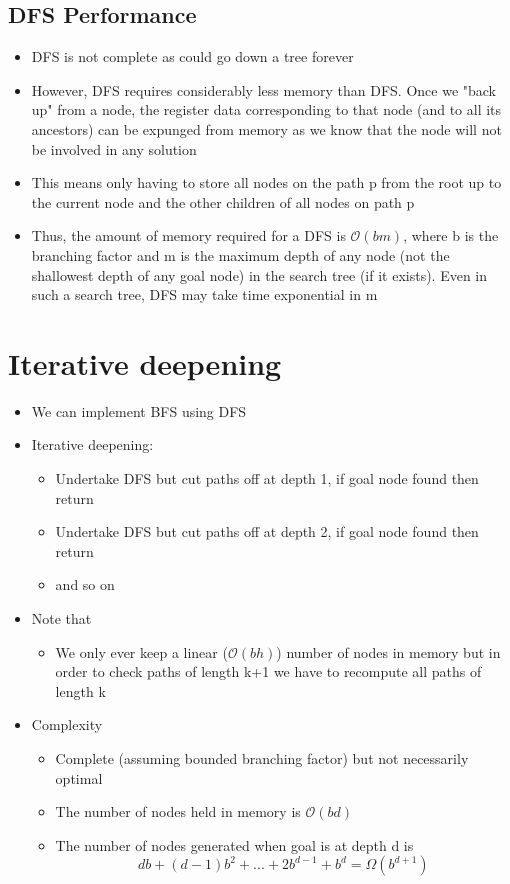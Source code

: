 \documentclass{article}[18pt]
\begin{document}
\subsection{DFS Performance}
\begin{itemize}
	\item DFS is not complete as could go down a tree forever
	\item However, DFS requires considerably less memory than DFS. Once we "back up" from a node, the register data corresponding to that node (and to all its ancestors) can be expunged from memory as we know that the node will not be involved in any solution
	\item This means only having to store all nodes on the path p from the root up to the current node and the other children of all nodes on path p
	\item Thus, the amount of memory required for a DFS is $\mathcal{O}(bm)$, where b is the branching factor and m is the maximum depth of any node (not the shallowest depth of any goal node) in the search tree (if it exists). Even in such a search tree, DFS may take time exponential in m
\end{itemize}
\section{Iterative deepening}
\begin{itemize}
	\item We can implement BFS using DFS
	\item Iterative deepening:
	\begin{itemize}
		\item Undertake DFS but cut paths off at depth 1, if goal node found then return
		\item Undertake DFS but cut paths off at depth 2, if goal node found then return
		\item and so on
	\end{itemize}
	\item Note that
	\begin{itemize}
		\item We only ever keep a linear ($\mathcal{O}(bh)$) number of nodes in memory but in order to check paths of length k+1 we have to recompute all paths of length k
	\end{itemize}
	\item Complexity
	\begin{itemize}
		\item Complete (assuming bounded branching factor) but not necessarily optimal
		\item The number of nodes held in memory is $\mathcal{O}(bd)$
		\item The number of nodes generated when goal is at depth d is
		$$db+(d-1)b^2+...+2b^{d-1}+b^d=\Omega(b^{d+1})$$
	\end{itemize}
	
	
\end{itemize}
\end{document}
